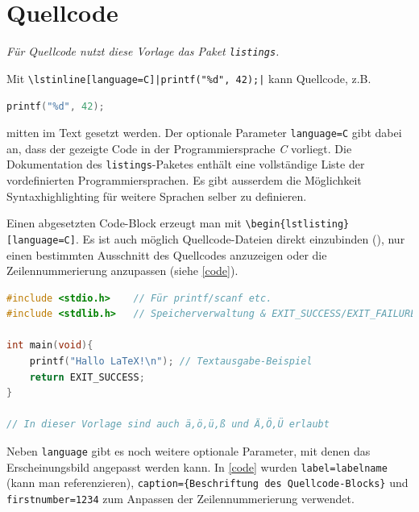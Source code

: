 		
	\section{Quellcode}
		\emph{Für Quellcode nutzt diese Vorlage das Paket \lstinline|listings|.}
		\medskip
		
		Mit \lstinline{\lstinline[language=C]|printf("%d", 42);|} kann Quellcode, z.B. \begin{vorlagenbeispiel}
		\lstinline[language=C]|printf("%d", 42);|
		\end{vorlagenbeispiel} mitten im Text gesetzt werden.
		Der optionale Parameter \lstinline[language=thesis-latexbeispiel]|language=C| gibt dabei an, dass der gezeigte Code in der Programmiersprache \emph{C} vorliegt.
%		
		Die Dokumentation des \lstinline[language=thesis-latexbeispiel]|listings|-Paketes enthält eine vollständige Liste der vordefinierten Programmiersprachen.
		Es gibt ausserdem die Möglichkeit Syntaxhighlighting für weitere Sprachen selber zu definieren.
		\bigskip
		
		Einen abgesetzten Code-Block erzeugt man mit \lstinline[language=thesis-latexbeispiel]|\begin{lstlisting}[language=C]|. Es ist auch möglich Quellcode-Dateien direkt einzubinden (\lstinline[language=thesis-latexbeispiel]||), nur einen bestimmten Ausschnitt des Quellcodes anzuzeigen oder die Zeilennummerierung anzupassen (siehe \autoref{code}).
		
		\begin{vorlagenbeispiel}
			\begin{lstlisting}[label=code, language=C, caption={Hello World-Beispiel im lstlisting-Beispiel},firstnumber=1234, emph={printf, schokostuecke}] 
#include <stdio.h>    // Für printf/scanf etc.
#include <stdlib.h>   // Speicherverwaltung & EXIT_SUCCESS/EXIT_FAILURE-Makros

int main(void){
	printf("Hallo LaTeX!\n"); // Textausgabe-Beispiel
	return EXIT_SUCCESS;
}

// In dieser Vorlage sind auch ä,ö,ü,ß und Ä,Ö,Ü erlaubt
			\end{lstlisting}
		\end{vorlagenbeispiel}
		
		Neben \lstinline|language| gibt es noch weitere optionale Parameter, mit denen das Erscheinungsbild angepasst werden kann.
		In \autoref{code} wurden \lstinline|label=labelname| (kann man referenzieren), \lstinline|caption={Beschriftung des Quellcode-Blocks}| und \lstinline|firstnumber=1234| zum Anpassen der Zeilennummerierung verwendet.
	
